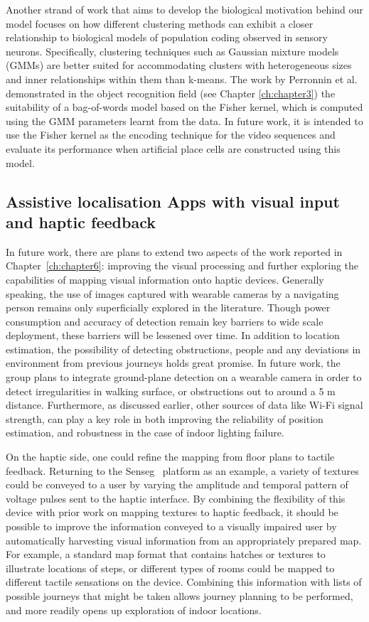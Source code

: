 Another strand of work that aims to develop the biological motivation behind our model focuses on how different clustering methods can exhibit a closer relationship to biological models of population coding observed in sensory neurons. Specifically, clustering techniques such as Gaussian mixture models (GMMs) are better suited for accommodating clusters with heterogeneous sizes and inner relationships within them than k-means. The work by Perronnin et al. \cite{ perronnin2007fisher, Perronnin2010, Jegou2012} demonstrated in the object recognition field (see Chapter \ref{ch:chapter3}) the suitability of a bag-of-words model based on the Fisher kernel, which is computed using the GMM parameters learnt from the data. In future work, it is intended to use the Fisher kernel as the encoding technique for the video sequences and evaluate its performance when artificial place cells are constructed using this model.

\subsection{Assistive localisation Apps with visual input and haptic feedback}

In future work, there are plans to extend two aspects of the work reported in Chapter~\ref{ch:chapter6}: improving the visual processing and further exploring the capabilities of mapping visual information onto haptic devices. Generally speaking, the use of images captured with wearable cameras by a navigating person remains only superficially explored in the literature. Though power consumption and accuracy of detection remain key barriers to wide scale deployment, these barriers will be lessened over time. In addition to location estimation, the possibility of detecting obstructions, people and any deviations in environment from previous journeys holds great promise. In future work, the group plans to integrate ground-plane detection on a wearable camera in order to detect irregularities in walking surface, or obstructions out to around a 5 m distance. Furthermore, as discussed earlier, other sources of data like Wi-Fi signal strength, can play a key role in both improving the reliability of position estimation, and robustness in the case of indoor lighting failure.

On the haptic side, one could refine the mapping from floor plans to tactile feedback. Returning to the Senseg\texttrademark~ platform as an example, a variety of textures could be conveyed to a user by varying the amplitude and temporal pattern of voltage pulses sent to the haptic interface. By combining the flexibility of this device with prior work on mapping textures to haptic feedback, it should be possible to improve the information conveyed to a visually impaired user by automatically harvesting visual information from an appropriately prepared map. For example, a standard map format that contains hatches or textures to illustrate locations of steps, or different types of rooms could be mapped to different tactile sensations on the device. Combining this information with lists of possible journeys that might be taken allows journey planning to be performed, and more readily opens up exploration of indoor locations.


